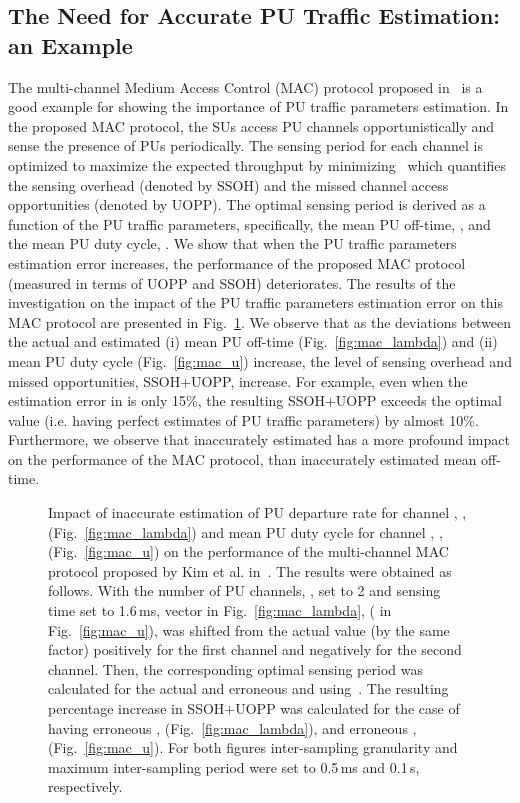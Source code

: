 \documentclass[11pt,draftclsnofoot,journal,onecolumn]{IEEEtran}
\begin{document}
\subsection{The Need for Accurate PU Traffic Estimation: an Example}
\label{sec:motovation}

The multi-channel Medium Access Control (MAC) protocol proposed in~\cite{kim_tmc_2008} is a good example for showing the importance of PU traffic parameters estimation. In the proposed MAC protocol, the SUs access PU channels opportunistically and sense the presence of PUs periodically. The sensing period for each channel is optimized to maximize the expected throughput by minimizing~\cite[Eq. (1)]{kim_tmc_2008} which quantifies the sensing overhead (denoted by SSOH) and the missed channel access opportunities (denoted by UOPP). The optimal sensing period is derived as a function of the PU traffic parameters, specifically, the mean PU off-time, , and the mean PU duty cycle, . We show that when the PU traffic parameters estimation error increases, the performance of the proposed MAC protocol (measured in terms of UOPP and SSOH) deteriorates. The results of the investigation on the impact of the PU traffic parameters estimation error on this MAC protocol are presented in Fig.~\ref{fig:mac_example}. We observe that as the deviations between the actual and estimated (i) mean PU off-time (Fig.~\ref{fig:mac_lambda}) and (ii) mean PU duty cycle (Fig.~\ref{fig:mac_u}) increase, the level of sensing overhead and missed opportunities, SSOH+UOPP, increase. For example, even when the estimation error in  is only 15\%, the resulting SSOH+UOPP exceeds the optimal value (i.e. having perfect estimates of PU traffic parameters) by almost 10\%. Furthermore, we observe that inaccurately estimated  has a more profound impact on the performance of the MAC protocol, than inaccurately estimated mean off-time.
\begin{figure}
\centering
{}
\caption{Impact of inaccurate estimation of PU departure rate for channel , , (Fig.~\ref{fig:mac_lambda}) and mean PU duty cycle for channel , , (Fig.~\ref{fig:mac_u}) on the performance of the multi-channel MAC protocol proposed by Kim et al. in~\cite{kim_tmc_2008}. The results were obtained as follows. With the number of PU channels, , set to 2 and sensing time set to 1.6\,ms, vector  in Fig.~\ref{fig:mac_lambda}, ( in Fig.~\ref{fig:mac_u}), was shifted from the actual value (by the same factor) positively for the first channel and negatively for the second channel. Then, the corresponding optimal sensing period was calculated for the actual and erroneous  and  using~\cite[Eq. (1)]{kim_tmc_2008}. The resulting percentage increase in SSOH+UOPP was calculated for the case of having erroneous , (Fig.~\ref{fig:mac_lambda}), and erroneous , (Fig.~\ref{fig:mac_u}). For both figures inter-sampling granularity and maximum inter-sampling period were set to 0.5\,ms and 0.1\,s, respectively.}
\label{fig:mac_example}
\end{figure}
\end{document}
